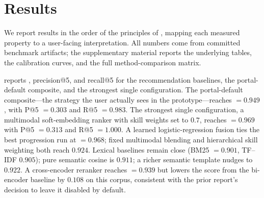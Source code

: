 \section{Results}\label{sec:7}

We report results in the order of the principles of , mapping each measured property to a user-facing interpretation.
All numbers come from committed benchmark artifacts; the supplementary material reports the underlying tables, the calibration curves, and the full method-comparison matrix.

 reports \ndcg{}, precision@5, and recall@5 for the recommendation baselines, the portal-default composite, and the strongest single configuration.
The portal-default composite---the strategy the user actually sees in the prototype---reaches \ndcg{} $= 0.949$, with P@5 $= 0.303$ and R@5 $= 0.983$.
The strongest single configuration, a multimodal soft-embedding ranker with skill weights set to $0.7$, reaches \ndcg{} $= 0.969$ with P@5 $= 0.313$ and R@5 $= 1.000$.
A learned logistic-regression fusion ties the best progression run at \ndcg{} $= 0.968$; fixed multimodal blending and hierarchical skill weighting both reach $0.924$.
Lexical baselines remain close (BM25 \ndcg{} $= 0.901$, TF--IDF $0.905$); pure semantic cosine is $0.911$; a richer semantic template nudges to $0.922$.
A cross-encoder reranker reaches \ndcg{} $= 0.939$ but lowers the score from the bi-encoder baseline by $0.108$ on this corpus, consistent with the prior report's decision to leave it disabled by default.

